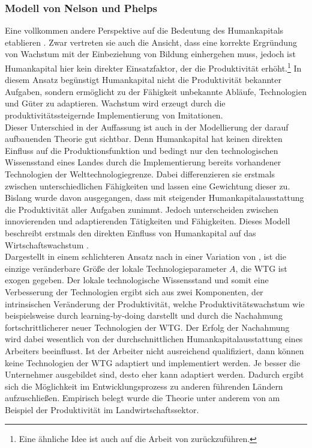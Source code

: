 \subsubsection*{Modell von Nelson und Phelps}
Eine vollkommen andere Perspektive auf die Bedeutung des Humankapitals etablieren \cite{Nelson.1966}. Zwar vertreten sie auch die Ansicht, dass eine korrekte Ergründung von Wachstum mit der Einbeziehung von Bildung einhergehen muss, jedoch ist Humankapital  hier kein direkter Einsatzfaktor, der die Produktivität erhöht.\footnote{Eine ähnliche Idee ist auch auf die Arbeit von \cite{Schultz.1964,Schultz.1975} zurückzuführen.} In diesem Ansatz begünstigt Humankapital nicht die Produktivität bekannter Aufgaben, sondern ermöglicht zu der Fähigkeit unbekannte Abläufe, Technologien und Güter zu adaptieren. Wachstum wird erzeugt durch die produktivitätssteigernde Implementierung von Imitationen. \\
%
Dieser Unterschied in der Auffassung ist auch in der Modellierung der darauf aufbauenden Theorie gut sichtbar. Denn Humankapital hat keinen direkten Einfluss auf die Produktionsfunktion und bedingt nur den technologischen Wissensstand eines Landes durch die Implementierung bereits vorhandener Technologien der Welttechnologiegrenze. Dabei differenzieren sie erstmals zwischen unterschiedlichen Fähigkeiten und lassen eine Gewichtung dieser zu. Bislang wurde davon ausgegangen, dass mit steigender Humankapitalausstattung die Produktivität aller Aufgaben zunimmt. Jedoch unterscheiden \cite{Nelson.1966} zwischen innovierenden und adaptierenden Tätigkeiten und Fähigkeiten. 
Dieses Modell beschreibt erstmals den direkten Einfluss von Humankapital auf das Wirtschaftswachstum \cite{Nelson.1966}.\\
%
Dargestellt in einem schlichteren Ansatz nach \cite{Nelson.1966} in einer Variation von \cite[Kapitel 10]{Acemoglu.2009}, ist die einzige veränderbare Größe der lokale Technologieparameter $A$, die WTG ist exogen gegeben. Der lokale technologische Wissensstand und somit eine Verbesserung der Technologien ergibt sich aus zwei Komponenten, der intrinsischen Veränderung der Produktivität, welche Produktivitätswachstum wie beispielsweise durch learning-by-doing darstellt und durch die Nachahmung fortschrittlicherer neuer Technologien der WTG. Der Erfolg der Nachahmung wird dabei wesentlich von der durchschnittlichen Humankapitalausstattung eines Arbeiters beeinflusst. Ist der Arbeiter nicht ausreichend qualifiziert, dann können keine Technologien der WTG adaptiert und implementiert werden. Je besser die Unternehmer ausgebildet sind, desto eher kann adaptiert werden. Dadurch ergibt sich die Möglichkeit im Entwicklungsprozess zu anderen führenden Ländern aufzuschließen. Empirisch belegt wurde die Theorie unter anderem von \cite{Foster.1995} am Beispiel der Produktivität im Landwirtschaftssektor.
%
